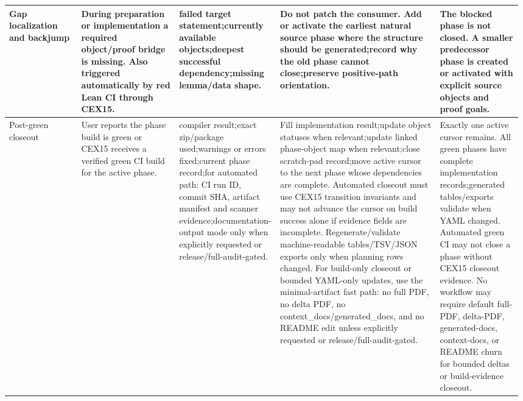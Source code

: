 \begin{longtable}{L{0.14\linewidth} L{0.19\linewidth} L{0.18\linewidth} L{0.31\linewidth} L{0.16\linewidth}}
\hline
\addlinespace[0.24em]
Gap localization and backjump & During preparation or implementation a required object/\allowbreak{}proof bridge is missing. Also triggered automatically by red Lean CI through CEX15. & failed target statement;\newline currently available objects;\newline deepest successful dependency;\newline missing lemma/\allowbreak{}data shape. & Do not patch the consumer. Add or activate the earliest natural source phase where the structure should be generated;\newline record why the old phase cannot close;\newline preserve positive-path orientation. & The blocked phase is not closed. A smaller predecessor phase is created or activated with explicit source objects and proof goals.\\
\hline
\addlinespace[0.24em]
Post-green closeout & User reports the phase build is green or CEX15 receives a verified green CI build for the active phase. & compiler result;\newline exact zip/\allowbreak{}package used;\newline warnings or errors fixed;\newline current phase record;\newline for automated path: CI run ID, commit SHA, artifact manifest and scanner evidence;\newline documentation-output mode only when explicitly requested or release/\allowbreak{}full-audit-gated. & Fill implementation result;\newline update object statuses when relevant;\newline update linked phase-object map when relevant;\newline close scratch-pad record;\newline move active cursor to the next phase whose dependencies are complete. Automated closeout must use CEX15 transition invariants and may not advance the cursor on build success alone if evidence fields are incomplete. Regenerate/\allowbreak{}validate machine-readable tables/\allowbreak{}TSV/\allowbreak{}JSON exports only when planning rows changed. For build-only closeout or bounded YAML-only updates, use the minimal-artifact fast path: no full PDF, no delta PDF, no context\_docs/\allowbreak{}generated\_docs, and no README edit unless explicitly requested or release/\allowbreak{}full-audit-gated. & Exactly one active cursor remains. All green phases have complete implementation records;\newline generated tables/\allowbreak{}exports validate when YAML changed. Automated green CI may not close a phase without CEX15 closeout evidence. No workflow may require default full-PDF, delta-PDF, generated-docs, context-docs, or README churn for bounded deltas or build-evidence closeout.\\

\end{longtable}
